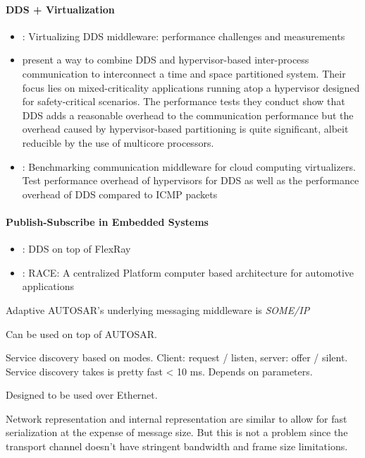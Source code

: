 \paragraph{DDS + Virtualization}
\begin{itemize}
	\item \cite{serrano2013virtualizing}: Virtualizing DDS middleware: performance challenges and measurements
	\item \citeauthor*{perez:gutierrez:ieeetpds16} \cite{perez:gutierrez:ieeetpds16} present a way to combine DDS and hypervisor-based inter-process communication to interconnect a time and space partitioned system. Their focus lies on mixed-criticality applications running atop a hypervisor designed for safety-critical scenarios. The performance tests they conduct show that DDS adds a reasonable overhead to the communication performance but the overhead caused by hypervisor-based partitioning is quite significant, albeit reducible by the use of multicore processors.
	\item \cite{garcia2013benchmarking}: Benchmarking communication middleware for cloud computing virtualizers. Test performance overhead of hypervisors for DDS as well as the performance overhead of DDS compared to ICMP packets
\end{itemize}


\paragraph{Publish-Subscribe in Embedded Systems}
\begin{itemize}
	\item \cite{bouhouch2013dds}: DDS on top of FlexRay
	\item \cite{sommer2013race}: RACE: A centralized Platform computer based architecture for automotive applications
\end{itemize}


Adaptive AUTOSAR's underlying messaging middleware is \emph{SOME/IP}

Can be used on top of AUTOSAR.

Service discovery based on modes. Client: request / listen, server: offer / silent.
Service discovery takes is pretty fast < 10 ms. Depends on parameters.

Designed to be used over Ethernet.

Network representation and internal representation are similar to allow for fast serialization at the expense of message size. But this is not a problem since the transport channel doesn't have stringent bandwidth and frame size limitations.

